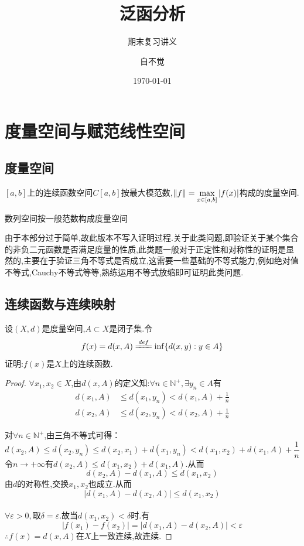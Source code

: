 \documentclass[lang=cn,18pt]{elegantbook}
\title{泛函分析}
\subtitle{期末复习讲义}
\author{自不觉}
\date{\today}
\begin{document}
\maketitle
\frontmatter

\tableofcontents

\mainmatter

\chapter{度量空间与赋范线性空间}
\section{度量空间}
\begin{example}
    $[a,b]$上的连续函数空间$C[a,b]$按最大模范数,$\Arrowvert f \Arrowvert=\max\limits_{x \in [a,b]}|f(x)|$构成的度量空间.
\end{example}

\begin{example}
    数列空间按一般范数构成度量空间
\end{example}

\begin{note}
    由于本部分过于简单,故此版本不写入证明过程.关于此类问题,即验证关于某个集合的非负二元函数是否满足度量的性质,此类题一般对于正定性和对称性的证明是显然的,主要在于验证三角不等式是否成立,这需要一些基础的不等式能力,例如绝对值不等式,Cauchy不等式等等,熟练运用不等式放缩即可证明此类问题.
\end{note}

\section{连续函数与连续映射}
\begin{example}
    设$(X,d)$是度量空间,$A \subset X$是闭子集.令
$$f(x)=d(x,A) \xlongequal[]{def}\inf \{d(x,y):y\in A\}$$
证明:$f(x)$是$X$上的连续函数.
\end{example}
\begin{proof}
    $\forall x_{1},x_{2}\in X $,由$d(x,A)$的定义知:$\forall n \in \mathbb{N}^+,\exists y_n \in A\text{有}$
    \begin{align*}
        d(x_{1},A) & \leqslant d(x_{1},y_n)< d(x_{1},A)+\frac{1}{n} \\
        d(x_2,A) & \leqslant d(x_{2},y_n)<d(x_{2},A)+\frac{1}{n}
    \end{align*}

对$\forall n \in \mathbb{N}^+$,由三角不等式可得：
$$d(x_{2},A)\leqslant d(x_2,y_n) \leqslant d(x_{2},x_{1})+d(x_{1},y_n)<d(x_{1},x_{2})+d(x_{1},A)+\frac{1}{n}$$ 
令$n \to +\infty$有$d(x_{2},A)\leqslant d(x_{1},x_{2})+d(x_{1},A) $.从而
$$d(x_{2},A)-d(x_{1},A)\leqslant d(x_{1},x_{2})$$
由$d$的对称性,交换$x_{1},x_{2}$也成立.从而
$$|d(x_{1},A)-d(x_{2},A)|\leqslant d(x_{1},x_{2}) $$\\
$\forall \varepsilon>0,$取$\delta =\varepsilon.$故当$d(x_{1},x_{2})<\delta$时.有$$|f(x_1)-f(x_2)|=|d(x_{1},A)-d(x_{2},A)|<\varepsilon$$  
$\therefore f(x)=d(x,A)$在$X$上一致连续,故连续.
\end{proof}
\end{document}
